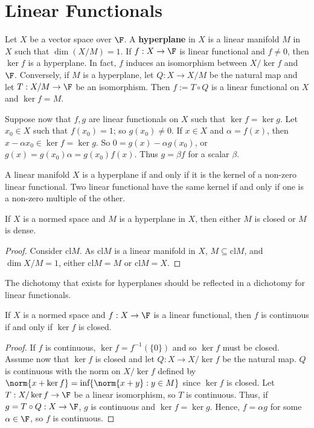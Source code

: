 \section{Linear Functionals}
\label{sec:BanLinFunc}

Let $X$ be a vector space over $\F$. A \textbf{hyperplane} in $X$ is a linear manifold $M$ in $X$ such that $\dim(X/M) = 1$. If $f:X\rightarrow \F$ is linear functional and $f \neq 0$, then $\ker f$ is a hyperplane. In fact, $f$ induces an isomorphism between $X/\ker f$ and $\F$. Conversely, if $M$ is a hyperplane, let $Q:X\rightarrow X/M$ be the natural map and let $T:X/M\rightarrow \F$ be an isomorphism. Then $f := T\circ Q$ is a linear functional on $X$ and $\ker f = M$.

Suppose now that $f,g$ are linear functionals on $X$ such that $\ker f = \ker g$. Let $x_0 \in X$ such that $f(x_0) = 1$; so $g(x_0) \neq 0$. If $x \in X$ and $\alpha = f(x)$, then $x-\alpha x_0 \in \ker f = \ker g$. So $0 = g(x) - \alpha g(x_0)$, or $g(x) = g(x_0)\alpha = g(x_0)f(x)$. Thus $g = \beta f$ for a scalar $\beta$.

\begin{prop}
    A linear manifold $X$ is a hyperplane if and only if it is the kernel of a non-zero linear functional. Two linear functional have the same kernel if and only if one is a non-zero multiple of the other.
\end{prop}

\begin{prop}
    If $X$ is a normed space and $M$ is a hyperplane in $X$, then either $M$ is closed or $M$ is dense.
\end{prop}
\begin{proof}
    Consider $\text{cl}M$. As $\text{cl}M$ is a linear manifold in $X$, $M \subseteq \text{cl}M$, and $\dim X/M = 1$, either $\text{cl}M = M$ or $\text{cl}M = X$.
\end{proof}


The dichotomy that exists for hyperplanes should be reflected in a dichotomy for linear functionals.

\begin{thm}
    If $X$ is a normed space and $f:X\rightarrow \F$ is a linear functional, then $f$ is continuous if and only if $\ker f$ is closed.
\end{thm}
\begin{proof}
    If $f$ is continuous, $\ker f = f^{-1}(\{0\})$ and so $\ker f$ must be closed. Assume now that $\ker f$ is closed and let $Q:X\rightarrow X/\ker f$ be the natural map. $Q$ is continuous with the norm on $X/\ker f$ defined by $\norm{x+\ker f} = \text{inf}\{\norm{x+y}:y \in M\}$ since $\ker f$ is closed. Let $T:X/\ker f\rightarrow \F$ be a linear isomorphism, so $T$ is continuous. Thus, if $g = T\circ Q:X\rightarrow \F$, $g$ is continuous and $\ker f = \ker g$. Hence, $f = \alpha g$ for some $\alpha \in \F$, so $f$ is continuous.
\end{proof}

